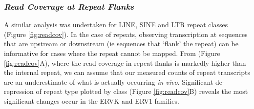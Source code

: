 \documentclass[onehalf,12pt]{beavtex}
\begin{document}
  \FloatBarrier
  
  \subsubsection*{\texorpdfstring{\emph{Read Coverage at Repeat
  Flanks}}{Read Coverage at Repeat Flanks}}\label{read-coverage-at-repeat-flanks}
  
  A similar analysis was undertaken for LINE, SINE and LTR repeat classes
  (Figure \ref{fig:readcov}). In the case of repeats, observing
  transcription at sequences that are upstream or downstream (ie sequences
  that `flank' the repeat) can be informative for cases where the repeat
  cannot be mapped. From (Figure \ref{fig:readcov}A), where the read
  coverage in repeat flanks is markedly higher than the internal repeat,
  we can assume that our measured counts of repeat transcripts are an
  underestimate of what is actually occurring \emph{in vivo}. Significant
  de-repression of repeat type plotted by class (Figure
  \ref{fig:readcov}B) reveals the most significant changes occur in the
  ERVK and ERV1 families.
  
\end{document}

